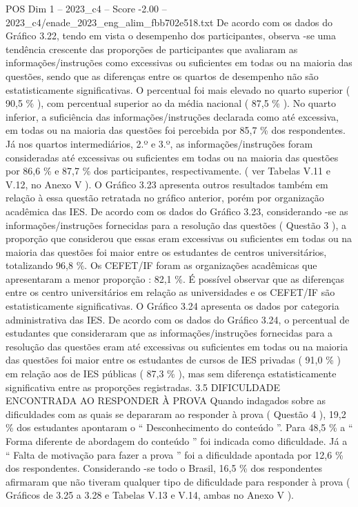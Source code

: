 \begin{textsample}{POS Dim 1 – 2023\_c4 – Score -2.00 – 2023\_c4/enade\_2023\_eng\_alim\_fbb702e518.txt}
De acordo com os dados do Gráfico 3.22, tendo em vista o desempenho dos participantes, observa -se uma tendência crescente das proporções de participantes que avaliaram as informações/instruções como excessivas ou suficientes em todas ou na maioria das questões, sendo que as diferenças entre os quartos de desempenho não são estatisticamente significativas.
O percentual foi mais elevado no quarto superior ( 90,5 \% ), com percentual superior ao da média nacional ( 87,5 \% ).
No quarto inferior, a suficiência das informações/instruções declarada como até excessiva, em todas ou na maioria das questões foi percebida por 85,7 \% dos respondentes.
Já nos quartos intermediários, 2.º e 3.º, as informações/instruções foram consideradas até excessivas ou suficientes em todas ou na maioria das questões por 86,6 \% e 87,7 \% dos participantes, respectivamente. ( ver Tabelas V.11 e V.12, no Anexo V ).
O Gráfico 3.23 apresenta outros resultados também em relação à essa questão retratada no gráfico anterior, porém por organização acadêmica das IES.
De acordo com os dados do Gráfico 3.23, considerando -se as informações/instruções fornecidas para a resolução das questões ( Questão 3 ), a proporção que considerou que essas eram excessivas ou suficientes em todas ou na maioria das questões foi maior entre os estudantes de centros universitários, totalizando 96,8 \%.
Os CEFET/IF foram as organizações acadêmicas que apresentaram a menor proporção : 82,1 \%.
É possível observar que as diferenças entre os centro universitários em relação as universidades e os CEFET/IF são estatisticamente significativas.
O Gráfico 3.24 apresenta os dados por categoria administrativa das IES.
De acordo com os dados do Gráfico 3.24, o percentual de estudantes que consideraram que as informações/instruções fornecidas para a resolução das questões eram até excessivas ou suficientes em todas ou na maioria das questões foi maior entre os estudantes de cursos de IES privadas ( 91,0 \% ) em relação aos de IES públicas ( 87,3 \% ), mas sem diferença estatisticamente significativa entre as proporções registradas. 3.5 DIFICULDADE ENCONTRADA AO RESPONDER À PROVA Quando indagados sobre as dificuldades com as quais se depararam ao responder à prova ( Questão 4 ), 19,2 \% dos estudantes apontaram o “ Desconhecimento do conteúdo ”.
Para 48,5 \% a “ Forma diferente de abordagem do conteúdo ” foi indicada como dificuldade.
Já a “ Falta de motivação para fazer a prova ” foi a dificuldade apontada por 12,6 \% dos respondentes.
Considerando -se todo o Brasil, 16,5 \% dos respondentes afirmaram que não tiveram qualquer tipo de dificuldade para responder à prova ( Gráficos de 3.25 a 3.28 e Tabelas V.13 e V.14, ambas no Anexo V ).

\end{textsample}

